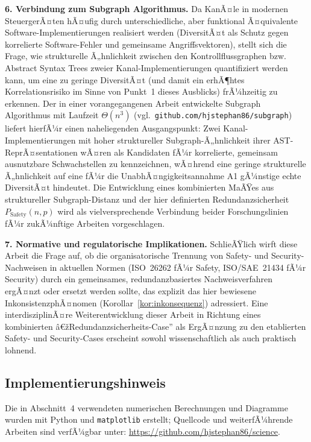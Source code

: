 ﻿\documentclass[a4paper,12pt]{article}
\theoremstyle{definition}
\begin{document}
\textbf{6. Verbindung zum Subgraph Algorithmus.} Da KanÃ¤le in modernen SteuergerÃ¤ten hÃ¤ufig durch unterschiedliche, aber funktional Ã¤quivalente Software-Implementierungen realisiert werden (DiversitÃ¤t als Schutz gegen korrelierte Software-Fehler und gemeinsame Angriffsvektoren), stellt sich die Frage, wie strukturelle Ã„hnlichkeit zwischen den Kontrollflussgraphen bzw. Abstract Syntax Trees zweier Kanal-Implementierungen quantifiziert werden kann, um eine zu geringe DiversitÃ¤t (und damit ein erhÃ¶htes Korrelationsrisiko im Sinne von Punkt~1 dieses Ausblicks) frÃ¼hzeitig zu erkennen. Der in einer vorangegangenen Arbeit entwickelte Subgraph Algorithmus mit Laufzeit $\Theta(n^3)$ (vgl.\ \texttt{github.com/hjstephan86/subgraph}) liefert hierfÃ¼r einen naheliegenden Ausgangspunkt: Zwei Kanal-Implementierungen mit hoher struktureller Subgraph-Ã„hnlichkeit ihrer AST-ReprÃ¤sentationen wÃ¤ren als Kandidaten fÃ¼r korrelierte, gemeinsam ausnutzbare Schwachstellen zu kennzeichnen, wÃ¤hrend eine geringe strukturelle Ã„hnlichkeit auf eine fÃ¼r die UnabhÃ¤ngigkeitsannahme A1 gÃ¼nstige echte DiversitÃ¤t hindeutet. Die Entwicklung eines kombinierten MaÃŸes aus struktureller Subgraph-Distanz und der hier definierten Redundanzsicherheit $P_{\mathrm{Safety}}(n,p)$ wird als vielversprechende Verbindung beider Forschungslinien fÃ¼r zukÃ¼nftige Arbeiten vorgeschlagen.

\textbf{7. Normative und regulatorische Implikationen.} SchlieÃŸlich wirft diese Arbeit die Frage auf, ob die organisatorische Trennung von Safety- und Security-Nachweisen in aktuellen Normen (ISO~26262 fÃ¼r Safety, ISO/SAE~21434 fÃ¼r Security) durch ein gemeinsames, redundanzbasiertes Nachweisverfahren ergÃ¤nzt oder ersetzt werden sollte, das explizit das hier bewiesene InkonsistenzphÃ¤nomen (Korollar~\ref{kor:inkonsequenz}) adressiert. Eine interdisziplinÃ¤re Weiterentwicklung dieser Arbeit in Richtung eines kombinierten â€žRedundanzsicherheits-Case'' als ErgÃ¤nzung zu den etablierten Safety- und Security-Cases erscheint sowohl wissenschaftlich als auch praktisch lohnend.

\subsection{Implementierungshinweis}

Die in Abschnitt~4 verwendeten numerischen Berechnungen und Diagramme wurden mit Python und \texttt{matplotlib} erstellt; Quellcode und weiterfÃ¼hrende Arbeiten sind verfÃ¼gbar unter: \url{https://github.com/hjstephan86/science}.
\end{document}
